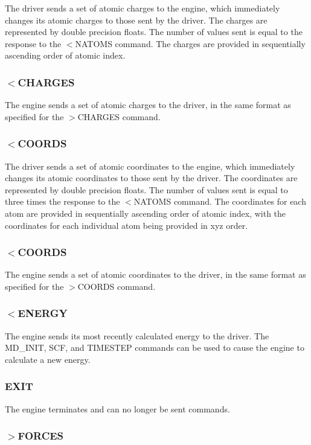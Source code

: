 The driver sends a set of atomic charges to the engine, which immediately changes its atomic charges to those sent by the driver. The charges are represented by double precision floats. The number of values sent is equal to the response to the $<$N\-A\-T\-O\-M\-S command. The charges are provided in sequentially ascending order of atomic index.\hypertarget{index_recv_charges}{}\subsubsection{$<$\-C\-H\-A\-R\-G\-E\-S}\label{index_recv_charges}
The engine sends a set of atomic charges to the driver, in the same format as specified for the {\ttfamily $>$C\-H\-A\-R\-G\-E\-S} command.\hypertarget{index_send_coords}{}\subsubsection{$<$\-C\-O\-O\-R\-D\-S}\label{index_send_coords}
The driver sends a set of atomic coordinates to the engine, which immediately changes its atomic coordinates to those sent by the driver. The coordinates are represented by double precision floats. The number of values sent is equal to three times the response to the $<$N\-A\-T\-O\-M\-S command. The coordinates for each atom are provided in sequentially ascending order of atomic index, with the coordinates for each individual atom being provided in xyz order.\hypertarget{index_send_coords}{}\subsubsection{$<$\-C\-O\-O\-R\-D\-S}\label{index_send_coords}
The engine sends a set of atomic coordinates to the driver, in the same format as specified for the {\ttfamily $>$C\-O\-O\-R\-D\-S} command.\hypertarget{index_recv_energy}{}\subsubsection{$<$\-E\-N\-E\-R\-G\-Y}\label{index_recv_energy}
The engine sends its most recently calculated energy to the driver. The {\ttfamily M\-D\-\_\-\-I\-N\-I\-T}, {\ttfamily S\-C\-F}, and {\ttfamily T\-I\-M\-E\-S\-T\-E\-P} commands can be used to cause the engine to calculate a new energy.\hypertarget{index_exit_command}{}\subsubsection{E\-X\-I\-T}\label{index_exit_command}
The engine terminates and can no longer be sent commands.\hypertarget{index_send_forces}{}\subsubsection{$>$\-F\-O\-R\-C\-E\-S}\label{index_send_forces}
